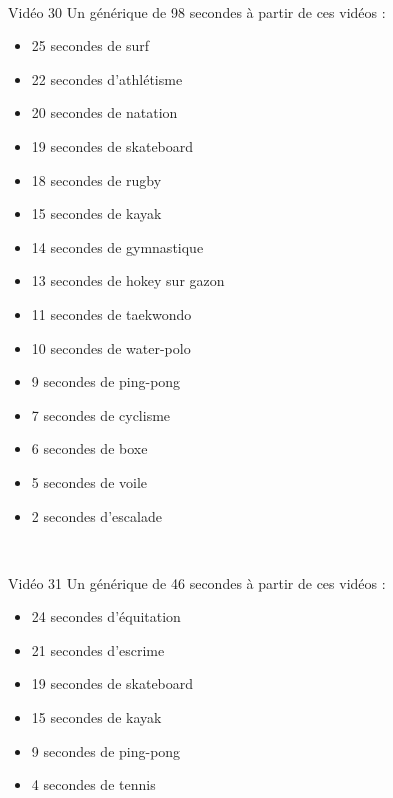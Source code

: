 \documentclass[10pt, a5paper,twoside]{article}
\begin{document}
\vfill

\clearpage
~
\vfill

\begin{card}[width = \textwidth, colback = olympicyellow, colframe = olympicyellow, bottomtitle = 2mm]{Vidéo 30}
  Un générique de 98 secondes à partir de ces vidéos :
  \vspace{-1mm}\begin{itemize}
    \item 25 secondes de surf
    \item 22 secondes d'athlétisme
    \item 20 secondes de natation
    \item 19 secondes de skateboard
    \item 18 secondes de rugby
    \item 15 secondes de kayak
    \item 14 secondes de gymnastique
    \item 13 secondes de hokey sur gazon
    \item 11 secondes de taekwondo
    \item 10 secondes de water-polo
    \item 9 secondes de ping-pong
    \item 7 secondes de cyclisme
    \item 6 secondes de boxe
    \item 5 secondes de voile
    \item 2 secondes d'escalade
  \end{itemize}
\end{card}

\vfill

\clearpage
~
\vfill

\begin{card}[width = \textwidth, colback = olympicviolet, colframe = olympicviolet, bottomtitle = 2mm]{Vidéo 31}
  Un générique de 46 secondes à partir de ces vidéos :
  \vspace{-1mm}\begin{itemize}
    \item 24 secondes d'équitation
    \item 21 secondes d'escrime
    \item 19 secondes de skateboard
    \item 15 secondes de kayak
    \item 9 secondes de ping-pong
    \item 4 secondes de tennis
  \end{itemize}
\end{card}
\end{document}
